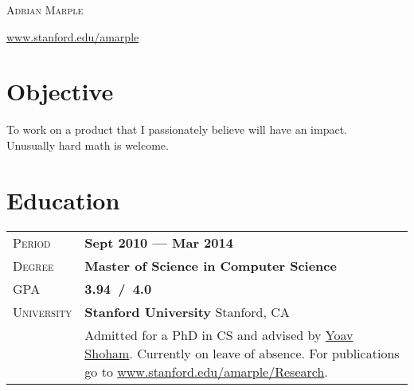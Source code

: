 \documentclass[a4paper, oneside, final]{scrartcl} %
\newcommand{\gray}{\rowcolor[gray]{.90}} %
\begin{document}
\begin{center} %


{\fontsize{36}{36}\selectfont\scshape Adrian Marple} %

\vspace{.5cm}

\href{http://www.stanford.edu/~amarple}{\fontsize{12.5}{17}\selectfont
\color{url-color}
www.stanford.edu/\hspace{2pt}amarple} %

\vspace{1cm} %


\section{Objective}

To work on a product that I passionately believe will have an impact. \\
Unusually hard math is welcome.


\section{Education}

\begin{tabularx}{0.97\linewidth}{>{\raggedleft\scshape}p{2cm}X}
\gray Period & \textbf{Sept 2010 --- Mar 2014}\\
\gray Degree & \textbf{Master of Science in Computer Science}\\
\gray GPA & \textbf{3.94\ /\ 4.0}\\
\gray University & \textbf{Stanford University} \hfill Stanford, CA\\
& Admitted for a PhD in CS and advised by \href{http://ai.stanford.edu/~shoham}{\color{url-color} Yoav Shoham}.  Currently on leave of absence.  For publications go to
\href{http://www.stanford.edu/~amarple/Research}{
\color{url-color}
www.stanford.edu/\hspace{1pt}{\raise.17ex\hbox{$\scriptstyle\mathtt{\sim}$}}\hspace{2pt}amarple/Research}.
\end{tabularx}


\end{center}
\end{document}
